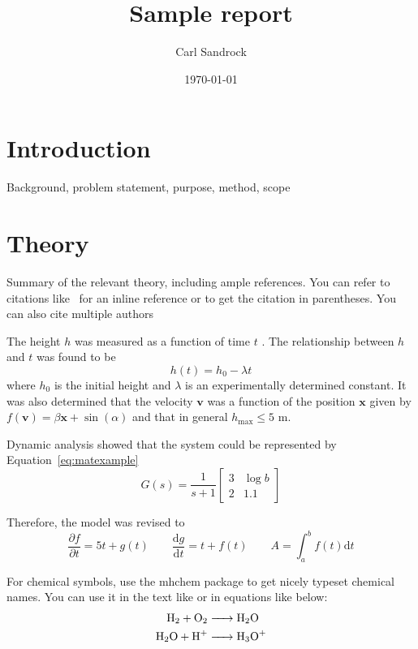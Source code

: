 \documentclass[a4paper,12pt]{article}
\title{Sample report}
\author{Carl Sandrock}
\date{\today}
\newcommand{\nomunit}[1]{%
\renewcommand{\nomentryend}{\hspace*{\fill}#1}}
\begin{document}


\section{Introduction}
Background, problem statement, purpose, method, scope

\section{Theory}
Summary of the relevant theory, including ample references. You can refer to citations like~\textcite{bruckmanmandersloot} for an inline reference or \parencite{bruckmanmandersloot} to get the citation in parentheses. You can also cite multiple authors~\parencite{mandersloot,bruckmanmandersloot}

The height $h$ \nomenclature{h}{Height \nomunit{m}} was measured as a function of time $t$ \nomenclature{t}{time \nomunit{s}}.  The relationship between $h$ and $t$ was found to be 
\begin{equation}
  \label{eq:commaexample}
  h(t) = h_0 - \lambda t
\end{equation}
where $h_0$ is the initial height and $\lambda$ is an experimentally
determined constant.  It was also determined that the velocity
$\mathbf{v}$ was a function of the position $\mathbf{x}$ given by
$f(\mathbf{v}) = \beta \mathbf{x} + \sin(\alpha)$ and that in general
$h_{\mathrm{max}} \leq 5$ m.

Dynamic analysis showed that the system could be represented by
Equation~\ref{eq:matexample}
\begin{equation}
  \label{eq:matexample}
  G(s) = \frac{1}{s+1}\left [ 
    \begin{array}{cc} 
      3 & \log{b} \\ 
      2 & \num{1.1} 
    \end{array} \right ]
\end{equation}

Therefore, the model was revised to
\begin{equation}
  \frac{\partial f}{\partial t} = 5t + g(t) \qquad \frac{\mathrm{d} g}{\mathrm{d} t} = t + f(t) \qquad A = \int_a^b f(t) \mathrm{d} t
\end{equation}

For chemical symbols, use the mhchem package to get nicely typeset chemical
names. You can use it in the text like  or in equations like below:
\begin{align}
  \label{eq:chemexample}
  \ce{H2 + O2 &-> H2O} \\
  \ce{H2O + H+ &-> H3O+}
\end{align}
\end{document}
